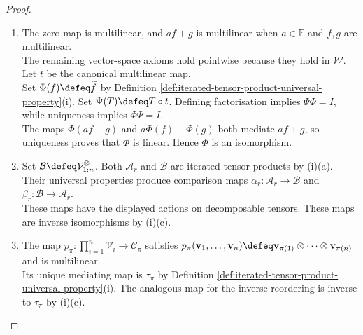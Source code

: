 \begin{theorem}
\begin{proof}
\begin{enumerate}[label=(\roman*)]
\begin{enumerate}[label=(\alph*)]
Thus $\pi=0$ by Definition \ref{def:iterated-tensor-product-universal-property}(i). Since $\pi$ is surjective by Proposition \ref{prop:quotient-map-properties}(ii), $\mathcal{T}/\mathcal{S}=0$ and $\mathcal{S}=\mathcal{T}$.
\item Let $(\mathcal{T},t)$ and $(\mathcal{U},u)$ be iterated tensor products. The universal properties produce a unique $F:\mathcal{T}\to\mathcal{U}$ with $F\circ t=u$.\\
They produce a unique $G:\mathcal{U}\to\mathcal{T}$ with $G\circ u=t$.\ Both $GF$ and $I_{\mathcal{T}}$ mediate $t$, while both $FG$ and $I_{\mathcal{U}}$ mediate $u$.\\
Uniqueness implies $GF=I_{\mathcal{T}}$, $FG=I_{\mathcal{U}}$. Any isomorphism preserving decomposable tensors also mediates $u$, so it equals $F$.
\end{enumerate}
\item The zero map is multilinear, and $af+g$ is multilinear when $a\in\mathbb{F}$ and $f,g$ are multilinear.\\
The remaining vector-space axioms hold pointwise because they hold in $\mathcal{W}$. Let $t$ be the canonical multilinear map.\\
Set $\Phi(f)\defeq\widetilde{f}$ by Definition \ref{def:iterated-tensor-product-universal-property}(i). Set $\Psi(T)\defeq T\circ t$. Defining factorisation implies $\Psi\Phi=I$, while uniqueness implies $\Phi\Psi=I$.\\
The maps $\Phi(af+g)$ and $a\Phi(f)+\Phi(g)$ both mediate $af+g$, so uniqueness proves that $\Phi$ is linear. Hence $\Phi$ is an isomorphism.
\item Set $\mathcal{B}\defeq\mathcal{V}_{1:n}^{\otimes}$. Both $\mathcal{A}_r$ and $\mathcal{B}$ are iterated tensor products by (i)(a).\\
Their universal properties produce comparison maps $\alpha_r:\mathcal{A}_r\to\mathcal{B}$ and $\beta_r:\mathcal{B}\to\mathcal{A}_r$.\\
These maps have the displayed actions on decomposable tensors. These maps are inverse isomorphisms by (i)(c).
\item The map $p_\pi:\prod\limits_{i=1}^{n}\mathcal{V}_i\to\mathcal{C}_\pi$ satisfies $p_\pi(\mathbf{v}_1,\ldots,\mathbf{v}_n)\defeq\mathbf{v}_{\pi(1)}\otimes\cdots\otimes\mathbf{v}_{\pi(n)}$ and is multilinear.\\
Its unique mediating map is $\tau_\pi$ by Definition \ref{def:iterated-tensor-product-universal-property}(i). The analogous map for the inverse reordering is inverse to $\tau_\pi$ by (i)(c).

\end{enumerate}
\end{proof}
\end{theorem}
